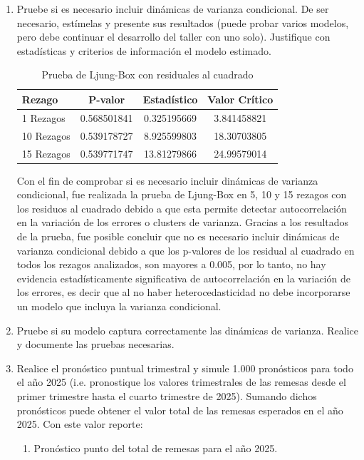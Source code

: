 \documentclass{article}
\theoremstyle{remark}
\theoremstyle{definition}
\begin{document}
\begin{enumerate}[label=\emph{\alph*})]
\begin{tcolorbox}[title=Soluci\'on 3.f]
        \end{tcolorbox}
        
    \item {Pruebe si es necesario incluir din\'amicas de varianza condicional. De ser necesario, est\'imelas y presente sus resultados (puede probar varios modelos, pero debe continuar el desarrollo del taller con uno solo). Justifique con estad\'isticas y criterios de informaci\'on el modelo estimado.}
        \begin{tcolorbox}[title=Soluci\'on 3.g]
 
\begin{table}[H]
\centering
\begin{tabular}{|l|c|c|c|}
\hline
\textbf{Rezago} & \textbf{P-valor} & \textbf{Estadístico} & \textbf{Valor Crítico} \\
\hline
1 Rezagos  & 0.568501841  & 0.325195669  & 3.841458821 \\
10 Rezagos & 0.539178727  & 8.925599803  & 18.30703805 \\
15 Rezagos & 0.539771747  & 13.81279866  & 24.99579014 \\
\hline
\end{tabular}
\caption{Prueba de Ljung-Box con residuales al cuadrado}
\end{table}
Con el fin de comprobar si es necesario incluir dinámicas de varianza condicional, fue realizada la prueba de Ljung-Box en 5, 10 y 15 rezagos con los residuos al cuadrado debido a que esta permite detectar autocorrelación en la variación de los errores o clusters de varianza. Gracias a los resultados de la prueba, fue posible concluir que no es necesario incluir dinámicas de varianza condicional debido a que los p-valores de los residual al cuadrado en todos los rezagos analizados, son mayores a 0.005, por lo tanto, no hay evidencia estadísticamente significativa de autocorrelación en la variación de los errores, es decir que al no haber heterocedasticidad no debe incorporarse un modelo que incluya la varianza condicional. 
        \end{tcolorbox}
    \item {Pruebe si su modelo captura correctamente las din\'amicas de varianza. Realice y documente las pruebas necesarias.}
        \begin{tcolorbox}[title=Soluci\'on 3.h]
            
        \end{tcolorbox}
    \item {Realice el pron\'ostico puntual trimestral y simule 1.000 pron\'osticos para todo el año 2025 (i.e. pronostique los valores trimestrales de las remesas desde el primer trimestre hasta el cuarto trimestre de 2025). Sumando dichos pron\'osticos puede obtener el valor total de las remesas esperados en el año 2025. Con este valor reporte:}
    \begin{enumerate}[label=(\emph{\roman*})]
        \item {Pron\'ostico punto del total de remesas para el año 2025.}
            \begin{tcolorbox}[title=Soluci\'on 3.i.i]


\end{tcolorbox}
\end{enumerate}
\end{enumerate}
\end{document}
